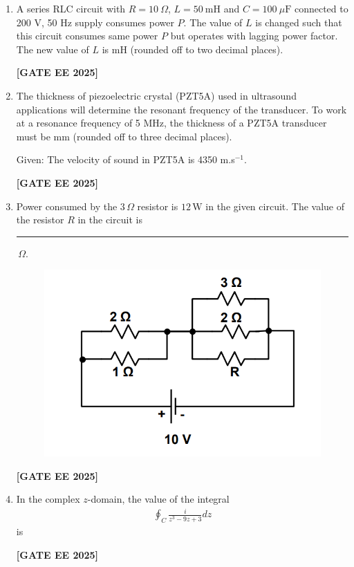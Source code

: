 \documentclass[journal]{IEEEtran}
\newcommand{\qfooter}{%
  \begin{flushright}\footnotesize\textbf{[GATE EE 2025]}\end{flushright}\vspace{1em}%
}
\begin{document}
\begin{enumerate}
\qfooter

\item A series RLC circuit with \(R = 10\ \Omega\), \(L = 50\ \text{mH}\) and \(C = 100\ \mu \text{F}\) connected to 200 V, 50 Hz supply consumes power \(P\). The value of \(L\) is changed such that this circuit consumes same power \(P\) but operates with lagging power factor. The new value of \(L\) is \underline{\hspace{2cm}} mH (rounded off to two decimal places).

\qfooter

\item The thickness of piezoelectric crystal (PZT5A) used in ultrasound applications will determine the resonant frequency of the transducer. To work at a resonance frequency of 5 MHz, the thickness of a PZT5A transducer must be \underline{\hspace{2cm}}mm (rounded off to three decimal places).

Given: The velocity of sound in PZT5A is 4350 m.s\(^{-1}\).

\qfooter

\item Power consumed by the $3\,\Omega$ resistor is $12\,\mathrm{W}$ in the given circuit. The value of the resistor $R$ in the circuit is \rule{2cm}{0.15mm}\,$\Omega$.

\begin{figure}[h]
\centering
\includegraphics[width=0.38\columnwidth]{figs/q35.png}
\end{figure}

\qfooter


\item In the complex \(z\)-domain, the value of the integral
\begin{align}
\oint_C \frac{i}{z^3 - 9z + 3} dz
\end{align}
is

\begin{enumerate}
\end{enumerate}
\qfooter


\end{enumerate}
\end{document}
